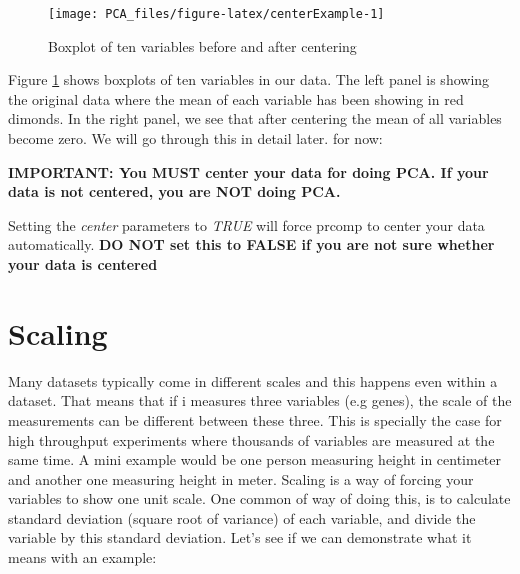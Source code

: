 \documentclass[
]{book}
\theoremstyle{definition}
\theoremstyle{definition}
\theoremstyle{definition}
\theoremstyle{remark}
\begin{document}
\begin{figure}

{\centering \texttt{[image: PCA\_files/figure-latex/centerExample-1]} 

}

\caption{Boxplot of ten variables before and after centering}\label{fig:centerExample}
\end{figure}

Figure \ref{fig:centerExample} shows boxplots of ten variables in our data. The left panel is showing the original data where the mean of each variable has been showing in red dimonds. In the right panel, we see that after centering the mean of all variables become zero. We will go through this in detail later. for now:

\textbf{IMPORTANT: You MUST center your data for doing PCA. If your data is not centered, you are NOT doing PCA.}

Setting the \emph{center} parameters to \emph{TRUE} will force prcomp to center your data automatically. \textbf{DO NOT set this to FALSE if you are not sure whether your data is centered}

\hypertarget{scaling}{%
\section{Scaling}\label{scaling}}

Many datasets typically come in different scales and this happens even within a dataset. That means that if i measures three variables (e.g genes), the scale of the measurements can be different between these three. This is specially the case for high throughput experiments where thousands of variables are measured at the same time. A mini example would be one person measuring height in centimeter and another one measuring height in meter. Scaling is a way of forcing your variables to show one unit scale. One common of way of doing this, is to calculate standard deviation (square root of variance) of each variable, and divide the variable by this standard deviation. Let's see if we can demonstrate what it means with an example:
\end{document}
